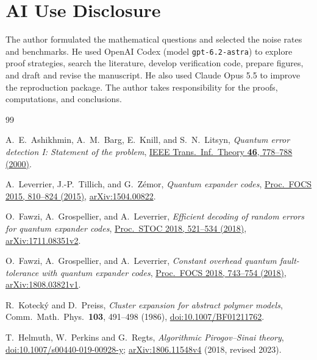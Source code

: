 \documentclass[10pt,twocolumn]{article}
\theoremstyle{definition}
\begin{document}
\section*{AI Use Disclosure}
\begingroup\small
The author formulated the mathematical questions and selected the noise
rates and benchmarks. He used OpenAI Codex (model \texttt{gpt-6.2-astra})
to explore proof strategies, search the literature, develop verification
code, prepare figures, and draft and revise the manuscript. He also used
Claude Opus 5.5 to improve the reproduction package. The author takes
responsibility for the proofs, computations, and conclusions.\par
\endgroup

\begin{thebibliography}{99}
\setlength{\itemsep}{0pt}
\setlength{\parskip}{0pt plus 0.25pt}
\addtolength{\baselineskip}{-0.2pt}

A.~E.~Ashikhmin, A.~M.~Barg, E.~Knill, and S.~N.~Litsyn,
\emph{Quantum error detection I: Statement of the problem},
\href{https://doi.org/10.1109/18.841162}{IEEE Trans.\ Inf.\ Theory
\textbf{46}, 778--788 (2000)}.

A.~Leverrier, J.-P.~Tillich, and G.~Z\'emor,
\emph{Quantum expander codes},
\href{https://doi.org/10.1109/FOCS.2015.55}{Proc.\ FOCS 2015, 810--824 (2015)},
\href{https://arxiv.org/abs/1504.00822}{arXiv:1504.00822}.

O.~Fawzi, A.~Grospellier, and A.~Leverrier,
\emph{Efficient decoding of random errors for quantum expander codes},
\href{https://doi.org/10.1145/3188745.3188886}{Proc.\ STOC 2018, 521--534 (2018)},
\href{https://arxiv.org/abs/1711.08351v2}{arXiv:1711.08351v2}.

O.~Fawzi, A.~Grospellier, and A.~Leverrier,
\emph{Constant overhead quantum fault-tolerance with quantum expander codes},
\href{https://doi.org/10.1109/FOCS.2018.00076}{Proc.\ FOCS 2018, 743--754 (2018)},
\href{https://arxiv.org/abs/1808.03821v1}{arXiv:1808.03821v1}.

R.~Koteck\'y and D.~Preiss,
\emph{Cluster expansion for abstract polymer models},
Comm.\ Math.\ Phys.\ \textbf{103}, 491--498 (1986), \href{https://doi.org/10.1007/BF01211762}{doi:10.1007/BF01211762}.

T.~Helmuth, W.~Perkins and G.~Regts,
\emph{Algorithmic Pirogov--Sinai theory},
\href{https://doi.org/10.1007/s00440-019-00928-y}{doi:10.1007/s00440-019-00928-y};
\href{https://arxiv.org/abs/1806.11548v4}{arXiv:1806.11548v4} (2018, revised 2023).


\end{thebibliography}
\end{document}
